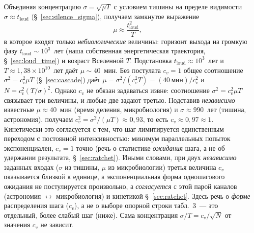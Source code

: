 \documentclass[12pt,a4paper]{article}
\begin{document}
Объединяя концентрацию $\sigma = \sqrt{\mu T}$ с условием тишины на пределе видимости $\sigma \approx t_{\mathrm{loud}}$ (\S~\ref{sec:silence_sigma}), получаем замкнутое выражение
\begin{equation}
\mu \approx \frac{t_{\mathrm{loud}}^{2}}{T},
\end{equation}
в которое входят только \emph{небиологические} величины: горизонт выхода на громкую фазу $t_{\mathrm{loud}} \sim 10^3$~лет (наша собственная энергетическая траектория, \S~\ref{sec:loud_time}) и возраст Вселенной $T$. Подстановка $t_{\mathrm{loud}} \approx 10^3$~лет и $T \approx 1{,}38 \times 10^{10}$~лет даёт $\mu \sim 40$~мин. Без постулата $c_v = 1$ общее соотношение $\sigma^2 = c_v^2\mu T$ (\S~\ref{sec:cascade}) даёт $\mu = \sigma^2/(c_v^2 T) = (40~\text{мин})/c_v^2$ и $N = c_v^2 (T/\sigma)^2$. Однако $c_v$ не обязан задаваться извне: соотношение $\sigma^2 = c_v^2\mu T$ связывает три величины, и любые две задают третью. Подставив \emph{независимо} известные $\mu \approx 40$~мин (время деления, микробиология) и $\sigma \approx 990$~лет (тишина, астрономия), получаем $c_v^2 = \sigma^2/(\mu T) \approx 0{,}93$, то есть $c_v \approx 0{,}97 \approx 1$. Кинетически это согласуется с тем, что шаг лимитируется единственным переходом с постоянной интенсивностью: минимум параллельных попыток экспоненциален, $c_v=1$ точно (речь о статистике \emph{ожидания} шага, а не об удержании результата, \S~\ref{sec:ratchet}). Иными словами, при двух \emph{независимо} заданных входах ($\sigma$ из тишины, $\mu$ из микробиологии) третья величина $c_v$ оказывается близкой к единице, а экспоненциальная форма одношагового ожидания не постулируется произвольно, а \emph{согласуется} с этой парой каналов (астрономия $\leftrightarrow$ микробиология) и кинетикой §~\ref{sec:ratchet}. Здесь речь о \emph{форме} распределения шага ($c_v$), а не о выборе опорной строки табл.~3~--- это отдельный, более слабый шаг (ниже). Сама концентрация $\sigma/T = c_v/\sqrt{N}$ от значения $c_v$ не зависит.
\end{document}
